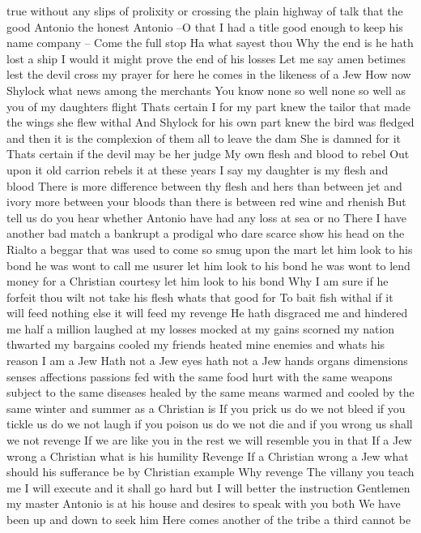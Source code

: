true without any slips of prolixity or crossing the
plain highway of talk that the good Antonio the
honest Antonio --O that I had a title good enough
to keep his name company --
Come the full stop
Ha what sayest thou Why the end is he hath
lost a ship
I would it might prove the end of his losses
Let me say amen betimes lest the devil cross my
prayer for here he comes in the likeness of a Jew
How now Shylock what news among the merchants
You know none so well none so well as you of my
daughters flight
Thats certain I for my part knew the tailor
that made the wings she flew withal
And Shylock for his own part knew the bird was
fledged and then it is the complexion of them all
to leave the dam
She is damned for it
Thats certain if the devil may be her judge
My own flesh and blood to rebel
Out upon it old carrion rebels it at these years
I say my daughter is my flesh and blood
There is more difference between thy flesh and hers
than between jet and ivory more between your bloods
than there is between red wine and rhenish But
tell us do you hear whether Antonio have had any
loss at sea or no
There I have another bad match a bankrupt a
prodigal who dare scarce show his head on the
Rialto a beggar that was used to come so smug upon
the mart let him look to his bond he was wont to
call me usurer let him look to his bond he was
wont to lend money for a Christian courtesy let him
look to his bond
Why I am sure if he forfeit thou wilt not take
his flesh whats that good for
To bait fish withal if it will feed nothing else
it will feed my revenge He hath disgraced me and
hindered me half a million laughed at my losses
mocked at my gains scorned my nation thwarted my
bargains cooled my friends heated mine
enemies and whats his reason I am a Jew Hath
not a Jew eyes hath not a Jew hands organs
dimensions senses affections passions fed with
the same food hurt with the same weapons subject
to the same diseases healed by the same means
warmed and cooled by the same winter and summer as
a Christian is If you prick us do we not bleed
if you tickle us do we not laugh if you poison
us do we not die and if you wrong us shall we not
revenge If we are like you in the rest we will
resemble you in that If a Jew wrong a Christian
what is his humility Revenge If a Christian
wrong a Jew what should his sufferance be by
Christian example Why revenge The villany you
teach me I will execute and it shall go hard but I
will better the instruction
Gentlemen my master Antonio is at his house and
desires to speak with you both
We have been up and down to seek him
Here comes another of the tribe a third cannot be
